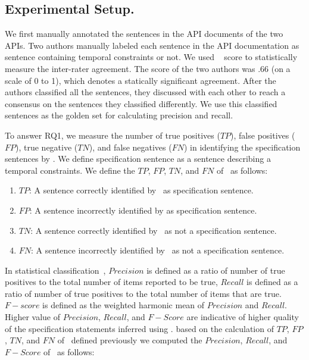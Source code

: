 \subsection{Experimental Setup.} 
We first manually annotated the sentences in the API documents of the two APIs.
Two authors manually labeled each sentence in the API documentation as sentence containing 
temporal constraints or not.
We used ~\cite{carletta1996assessing} score to statistically measure
the inter-rater agreement.
The  score of the two authors was .66 (on a scale of 0 to 1), 
which denotes a statically significant agreement. 
After the authors classified all the sentences, they 
discussed with each other to reach a consensus on the sentences they classified differently. 
We use this classified sentences as the golden set for calculating precision and recall.

 


To answer RQ1, we measure the number of true positives ($TP$), false positives ($FP$), true negative ($TN$), and false negatives ($FN$)
in identifying the specification sentences by \tool.
We define specification sentence as a sentence describing a temporal constraints.
We define the $TP$, $FP$, $TN$, and $FN$ of \tool\ as follows:

\begin{enumerate}
	\item $TP$: A sentence correctly identified by \tool\ as specification sentence.
	\item $FP$: A sentence incorrectly identified by \tool as specification sentence.
	\item $TN$: A sentence correctly identified by \tool\ as not a specification sentence.
	\item $FN$: A sentence incorrectly identified by \tool\ as not a specification sentence.
\end{enumerate}


In statistical classification~\cite{Olson08}, $Precision$ is defined as a ratio of
number of true positives to the total number of items reported to be true,
$Recall$ is defined as a ratio of number of true positives to the total number
of items that are true. $F-score$ is defined as the weighted harmonic mean of 
$Precision$ and $Recall$. Higher value of $Precision$, $Recall$, and $F-Score$
are indicative of higher quality of the specification statements inferred using 
\tool. based on the calculation of $TP$, $FP$, $TN$, and $FN$ of \tool\ defined
previously we computed the $Precision$, $Recall$, and $F-Score$ of \tool\ as follows:



